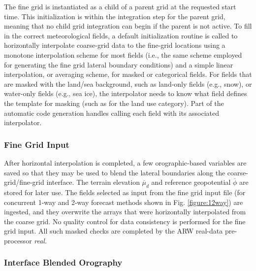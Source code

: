The fine grid is instantiated as a child 
of a parent grid at the requested start time.
This initialization is within the integration step for the parent 
grid, meaning that no child grid integration can begin if the parent is not active.  
To fill in the correct meteorological 
fields, a default initialization routine is called to horizontally interpolate
coarse-grid data to the fine-grid locations using a monotone
interpolation scheme \citep[described in][]{smolargrell92} for most fields 
(i.e., the same scheme employed for generating the fine grid lateral
boundary conditions)
and a simple linear interpolation, or averaging scheme, for masked or
categorical fields.
For fields that are masked with the land/sea background, such 
as land-only fields (e.g., snow), or water-only fields (e.g., sea ice), the 
interpolator needs to know what field defines the template for masking
(such as for the land use category).  Part of the automatic code generation handles
calling each field with its associated interpolator.

\subsubsection{Fine Grid Input}

After horizontal interpolation is completed, a few orographic-based variables 
are saved so that they may be used to blend the lateral boundaries
along the coarse-grid/fine-grid interface.  
The terrain elevation 
$\overline {\mu}_d$
and reference geopotential $\overline{\phi}$ are stored for later use.
The fields selected as input from the fine grid input file (for 
concurrent 1-way and 2-way forecast methods shown in Fig. \ref{figure:12way}) are ingested, and
they overwrite the arrays that were horizontally interpolated from the
coarse grid.  No quality control for data consistency is performed
for the fine grid input.  All such masked checks are
completed by the ARW real-data pre-processor {\it real}.

\subsubsection{Interface Blended Orography}

